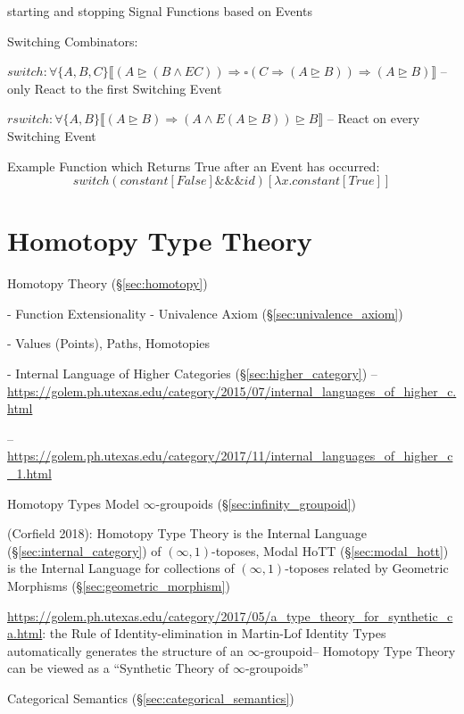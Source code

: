 starting and stopping Signal Functions based on Events

Switching Combinators:

$switch : \forall\{A,B,C\} \llbracket (A \unrhd (B \wedge E C))
  \Rightarrow \square(C \Rightarrow (A \unrhd B))
  \Rightarrow (A \unrhd B) \rrbracket$ -- only React to the first
  Switching Event

$rswitch : \forall\{A,B\} \llbracket (A \unrhd B)
  \Rightarrow (A \wedge E(A \unrhd B)) \unrhd B \rrbracket$ -- React
  on every Switching Event

Example Function which Returns True after an Event has occurred:
\[
  switch(constant[False] \&\&\& id)[\lambda x.constant[True]]
\]



\section{Homotopy Type Theory}\label{sec:hott}

Homotopy Theory (\S\ref{sec:homotopy})

- Function Extensionality
- Univalence Axiom (\S\ref{sec:univalence_axiom})

- Values (Points), Paths, Homotopies

- Internal Language of Higher Categories (\S\ref{sec:higher_category})
--\url{https://golem.ph.utexas.edu/category/2015/07/internal_languages_of_higher_c.html}

--\url{https://golem.ph.utexas.edu/category/2017/11/internal_languages_of_higher_c_1.html}

Homotopy Types Model $\infty$-groupoids (\S\ref{sec:infinity_groupoid})

(Corfield 2018): Homotopy Type Theory is the Internal Language
(\S\ref{sec:internal_category}) of $(\infty,1)$-toposes, Modal HoTT
(\S\ref{sec:modal_hott}) is the Internal Language for collections of
$(\infty,1)$-toposes related by Geometric Morphisms
(\S\ref{sec:geometric_morphism})

\url{https://golem.ph.utexas.edu/category/2017/05/a_type_theory_for_synthetic_ca.html}:
the Rule of Identity-elimination in Martin-Lof Identity Types
automatically generates the structure of an $\infty$-groupoid--
Homotopy Type Theory can be viewed as a ``Synthetic Theory of
$\infty$-groupoids''

Categorical Semantics (\S\ref{sec:categorical_semantics})

